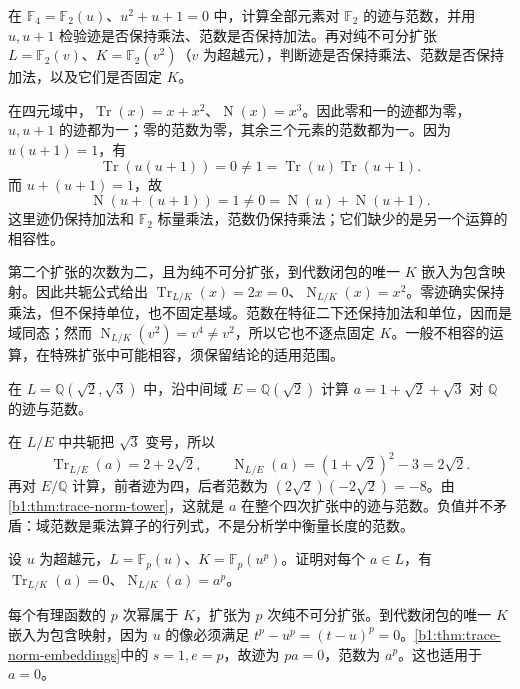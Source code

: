 \begin{exercise}\label{b1:ex:18-not-ring-maps}
	在 \(\mathbb F_4=\mathbb F_2(u)\)、\(u^2+u+1=0\) 中，计算全部元素对 \(\mathbb F_2\) 的迹与范数，并用 \(u,u+1\) 检验迹是否保持乘法、范数是否保持加法。再对纯不可分扩张 \(L=\mathbb F_2(v)\)、\(K=\mathbb F_2(v^2)\)（\(v\) 为超越元），判断迹是否保持乘法、范数是否保持加法，以及它们是否固定 \(K\)。
\end{exercise}
\begin{solution}
	在四元域中，\(\operatorname{Tr}(x)=x+x^2\)、\(\operatorname{N}(x)=x^3\)。因此零和一的迹都为零，\(u,u+1\) 的迹都为一；零的范数为零，其余三个元素的范数都为一。因为 \(u(u+1)=1\)，有
	\[
		\operatorname{Tr}(u(u+1))=0\ne1=\operatorname{Tr}(u)\operatorname{Tr}(u+1).
	\]
	而 \(u+(u+1)=1\)，故
	\[
		\operatorname{N}(u+(u+1))=1\ne0=\operatorname{N}(u)+\operatorname{N}(u+1).
	\]
	这里迹仍保持加法和 \(\mathbb F_2\) 标量乘法，范数仍保持乘法；它们缺少的是另一个运算的相容性。

	第二个扩张的次数为二，且为纯不可分扩张，到代数闭包的唯一 \(K\) 嵌入为包含映射。因此共轭公式给出 \(\operatorname{Tr}_{L/K}(x)=2x=0\)、\(\operatorname{N}_{L/K}(x)=x^2\)。零迹确实保持乘法，但不保持单位，也不固定基域。范数在特征二下还保持加法和单位，因而是域同态；然而 \(\operatorname{N}_{L/K}(v^2)=v^4\ne v^2\)，所以它也不逐点固定 \(K\)。一般不相容的运算，在特殊扩张中可能相容，须保留结论的适用范围。
\end{solution}

\begin{exercise}\label{b1:ex:18-tower-calculation}
	在 \(L=\mathbb Q(\sqrt2,\sqrt3)\) 中，沿中间域 \(E=\mathbb Q(\sqrt2)\) 计算 \(a=1+\sqrt2+\sqrt3\) 对 \(\mathbb Q\) 的迹与范数。
\end{exercise}
\begin{solution}
	在 \(L/E\) 中共轭把 \(\sqrt3\) 变号，所以
	\[
		\operatorname{Tr}_{L/E}(a)=2+2\sqrt2,\qquad \operatorname{N}_{L/E}(a)=(1+\sqrt2)^2-3=2\sqrt2.
	\]
	再对 \(E/\mathbb Q\) 计算，前者迹为四，后者范数为 \((2\sqrt2)(-2\sqrt2)=-8\)。由\cref{b1:thm:trace-norm-tower}，这就是 \(a\) 在整个四次扩张中的迹与范数。负值并不矛盾：域范数是乘法算子的行列式，不是分析学中衡量长度的范数。
\end{solution}

\begin{exercise}\label{b1:ex:18-purely-inseparable}
	设 \(u\) 为超越元，\(L=\mathbb F_p(u)\)、\(K=\mathbb F_p(u^p)\)。证明对每个 \(a\in L\)，有 \(\operatorname{Tr}_{L/K}(a)=0\)、\(\operatorname{N}_{L/K}(a)=a^p\)。
\end{exercise}
\begin{solution}
	每个有理函数的 \(p\) 次幂属于 \(K\)，扩张为 \(p\) 次纯不可分扩张。到代数闭包的唯一 \(K\) 嵌入为包含映射，因为 \(u\) 的像必须满足 \(t^p-u^p=(t-u)^p=0\)。\cref{b1:thm:trace-norm-embeddings}中的 \(s=1,e=p\)，故迹为 \(pa=0\)，范数为 \(a^p\)。这也适用于 \(a=0\)。
\end{solution}

